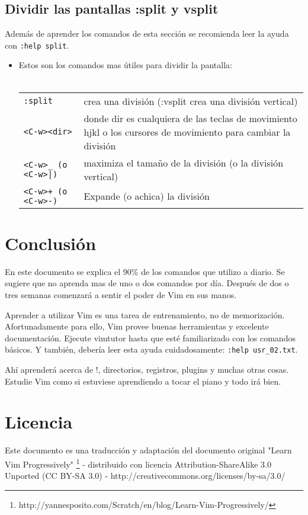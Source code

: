 \documentclass[12pt]{article}
\begin{document}
\subsection{Dividir las pantallas :split y vsplit}

Además de aprender los comandos de esta sección se recomienda leer la ayuda con \texttt{:help split}.

\begin{itemize}
	\item Estos son los comandos mas útiles para dividir la pantalla: \\ \\
\begin{tabular}{ l l }
	\texttt{:split} & crea una división (:vsplit crea una división vertical) \\
	\texttt{<C-w><dir>} & donde dir es cualquiera de las teclas de movimiento hjkl o los cursores de movimiento para cambiar la división \\
	\texttt{<C-w>\_ (o <C-w>|)} & maximiza el tamaño de la división (o la división vertical) \\
	\texttt{<C-w>+ (o <C-w>-)} & Expande (o achica) la división \\
\end{tabular}
\end{itemize}



\section{Conclusión}

En este documento se explica el 90\% de los comandos que utilizo a diario. Se sugiere que no aprenda mas de uno o dos comandos por día. Después de dos o tres semanas comenzará a sentir el poder de Vim en sus manos.

Aprender a utilizar Vim es una tarea de entrenamiento, no de memorización. Afortunadamente para ello, Vim 
provee buenas herramientas y excelente documentación. Ejecute vimtutor hasta que esté familiarizado con los comandos básicos. Y también, debería leer esta ayuda cuidadosamente:  \texttt{:help usr\_02.txt}.

Ahí aprenderá acerca de !, directorios, registros, plugins y muchas otras cosas. Estudie Vim como si estuviese aprendiendo a tocar el piano y todo irá bien.

\section{Licencia}
Este documento es una traducción y adaptación del documento
original "Learn Vim Progressively"
\footnote{http://yannesposito.com/Scratch/en/blog/Learn-Vim-Progressively/}
 - distribuido con licencia
Attribution-ShareAlike 3.0 Unported (CC BY-SA 3.0) - 
http://creativecommons.org/licenses/by-sa/3.0/
\end{document}
